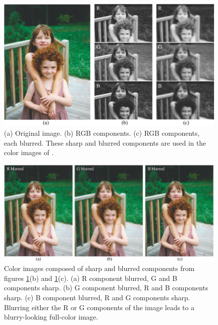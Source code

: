 \begin{figure}
\centerline{
\includegraphics[width=1.0\linewidth]{figures/color/nonblur_girls.eps}
}
\caption{(a) Original image.  (b) RGB components.  (c) RGB components,
  each blurred.  These sharp and blurred components are used  in the color images of \fig{\ref{fig:girls2}}.
}
\label{fig:girls1}
\end{figure}



\begin{figure}
\centerline{
\includegraphics[width=1.0\linewidth]{figures/color/blur_rgb_girls.eps}
}
\caption{Color images composed of sharp and blurred components from figures \ref{fig:girls1}(b) and \ref{fig:girls1}(c).  (a) R component blurred, G and B components sharp.  (b)  G component blurred, R and B components sharp. (c) B component blurred, R and G components sharp. Blurring either the R or G components of the image leads to a blurry-looking full-color image.
}
\label{fig:girls2}
\end{figure}

